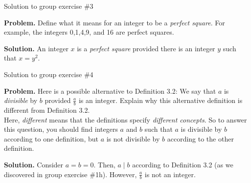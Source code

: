 \documentclass[10pt]{beamer}
\begin{document}
\begin{frame}{Solution to group exercise \#3}

\textbf{Problem.} Define what it means for an integer to be a \textit{perfect square}.  For example, the integers 0,1,4,9, and 16 are perfect squares.  

\pause 
\vfill 
\textbf{Solution.} An integer $x$ is a \textit{perfect square} provided there is an integer $y$ such that $x=y^2$.

\end{frame}

\begin{frame}{Solution to group exercise \#4}

\textbf{Problem.} Here is a possible alternative to Definition 3.2: We say that $a$ is \textit{divisible} by $b$ provided $\frac{a}{b}$ is an integer.  Explain why this alternative definition is different from Definition 3.2.  \\
\hspace{0.5cm} Here, \textit{different} means that the definitions specify \textit{different concepts}.  So to answer this question, you should find integers $a$ and $b$ such that $a$ is divisible by $b$ according to one definition, but $a$ is not divisible by $b$ according to the other definition.

\pause 
\vfill 
\textbf{Solution.} Consider $a=b=0$. Then,  $a \mid b$ according to Definition 3.2 (as we discovered in group exercise \#1h). However, $\frac{a}{b}$ is not an integer.
\end{frame}
\end{document}
